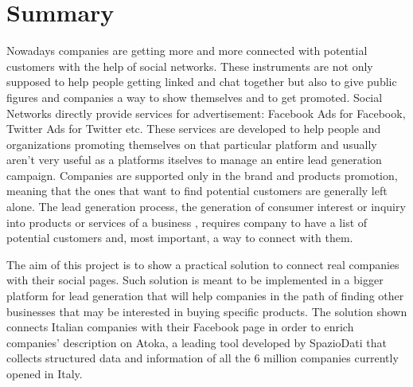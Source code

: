 \chapter*{Summary} %
\label{Summary}

Nowadays companies are getting more and more connected with potential customers with the help of social networks. These instruments are not only supposed to help people getting linked and chat together but also to give public figures and companies a way to show themselves and to get promoted. Social Networks directly provide services for advertisement: Facebook Ads for Facebook, Twitter Ads for Twitter etc. These services are developed to help people and organizations promoting themselves on that particular platform and usually aren't very useful as a platforms itselves to manage an entire lead generation campaign. Companies are supported only in the brand and products promotion, meaning that the ones that want to find potential customers are generally left alone. The lead generation process, the generation of consumer interest or inquiry into products or services of a business
, requires company to have a list of potential customers and, most important, a way to connect with them.


The aim of this project is to show a practical solution to connect real companies with their social pages.
Such solution is meant to be implemented in a bigger platform for lead generation that will help companies in the path of finding other businesses that may be interested in buying specific products. 
The solution shown connects Italian companies with their Facebook page in order to enrich companies' description on Atoka\cite{atoka}, a leading tool developed by SpazioDati\cite{spaziodati} that collects structured data and information of all the 6 million companies currently opened in Italy.


